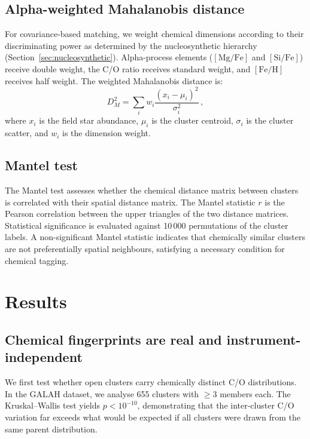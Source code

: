 \documentclass[fleqn,usenatbib]{mnras}
\newcommand{\feh}{$\mathrm{[Fe/H]}$\xspace}
\newcommand{\mgfe}{$\mathrm{[Mg/Fe]}$\xspace}
\newcommand{\sife}{$\mathrm{[Si/Fe]}$\xspace}
\newcommand{\co}{C/O\xspace}
\begin{document}
\subsection{Alpha-weighted Mahalanobis distance}
\label{sec:mahalanobis}

For covariance-based matching, we weight chemical dimensions according to their discriminating power as determined by the nucleosynthetic hierarchy (Section~\ref{sec:nucleosynthetic}).
Alpha-process elements (\mgfe and \sife) receive double weight, the \co ratio receives standard weight, and \feh receives half weight.
The weighted Mahalanobis distance is:
\begin{equation}
D_M^2 = \sum_i w_i \frac{(x_i - \mu_i)^2}{\sigma_i^2} \,,
\label{eq:mahalanobis}
\end{equation}
where $x_i$ is the field star abundance, $\mu_i$ is the cluster centroid, $\sigma_i$ is the cluster scatter, and $w_i$ is the dimension weight.

\subsection{Mantel test}
\label{sec:mantel}

The Mantel test \citep{Mantel1967} assesses whether the chemical distance matrix between clusters is correlated with their spatial distance matrix.
The Mantel statistic $r$ is the Pearson correlation between the upper triangles of the two distance matrices.
Statistical significance is evaluated against 10\,000 permutations of the cluster labels.
A non-significant Mantel statistic indicates that chemically similar clusters are not preferentially spatial neighbours, satisfying a necessary condition for chemical tagging.


\section{Results}
\label{sec:results}

\subsection{Chemical fingerprints are real and instrument-independent}
\label{sec:reality}

We first test whether open clusters carry chemically distinct \co distributions.
In the GALAH dataset, we analyse 655 clusters with $\geq 3$ members each.
The Kruskal--Wallis test yields $p < 10^{-10}$, demonstrating that the inter-cluster \co variation far exceeds what would be expected if all clusters were drawn from the same parent distribution.
\end{document}
